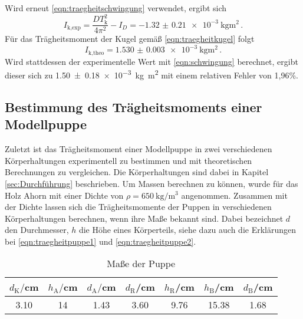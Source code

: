 Wird erneut \eqref{eqn:traegheitschwingung} verwendet, ergibt sich
\begin{equation}
  I_{\text{k,exp}} = \frac{DT_{\text{k}}^2}{4\pi^2}-I_D = \SI{-1.32(021)e-3}{\kilogram\meter\squared}\,.
\end{equation}
Für das Trägheitsmoment der Kugel gemäß \eqref{eqn:traegheitkugel} folgt
\begin{equation}
  I_{\text{k,theo}} = \SI{1.530(0003)e-3}{\kilogram\meter\squared}\,.
\end{equation}
Wird stattdessen der experimentelle Wert mit \eqref{eqn:schwingung} berechnet,
ergibt dieser sich zu \SI{1.50(018)e-3}{\kilogram\meter\squared} mit einem relativen
Fehler von 1,96\%.

\subsection{Bestimmung des Trägheitsmoments einer Modellpuppe}
Zuletzt ist das Trägheitsmoment einer Modellpuppe in zwei verschiedenen
Körperhaltungen experimentell zu bestimmen und mit theoretischen Berechnungen zu
vergleichen. Die Körperhaltungen sind dabei in Kapitel \ref{sec:Durchführung} beschrieben.
Um Massen berechnen zu können, wurde für das Holz Ahorn mit einer Dichte von
$\rho=\SI{650}{\kilogram\per\meter\cubed}$ \cite{Ahorn} angenommen.
Zusammen mit der Dichte lassen sich die Trägheitsmomente der Puppen in
verschiedenen Körperhaltungen berechnen, wenn ihre Maße bekannt sind. Dabei
bezeichnet $d$ den Durchmesser, $h$ die Höhe eines Körperteils, siehe dazu auch
die Erklärungen bei \eqref{eqn:traegheitpuppe1} und \eqref{eqn:traegheitpuppe2}.
\begin{table}
\centering
\caption{Maße der Puppe}
\label{tab:maßepuppe}
\begin{tabular}{c c c c c c c}
\toprule
$d_{\text{K}}/$cm & $h_{\text{A}}/$cm & $d_{\text{A}}/$cm & $d_{\text{R}}$/cm &
$h_{\text{R}}$/cm & $h_{\text{B}}$/cm & $d_{\text{B}}$/cm \\
\midrule
3.10 & 14 & 1.43 & 3.60 & 9.76 & 15.38 & 1.68\\
\bottomrule
\end{tabular}
\end{table}
